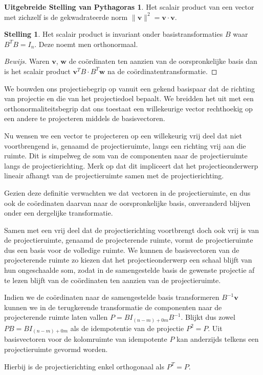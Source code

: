 \documentclass{amsart}
\theoremstyle{definition}
\newtheorem{thm}{Stelling}[section]
\newenvironment{bewijs}{\begin{proof}[Bewijs]}{\end{proof}}
\newcommand{\norm}[1]{\lVert{#1}\rVert}
\newcommand{\vvec}[1][v]{\mathbf{#1}}
\newcommand{\vnorm}[1]{\norm{\vvec[#1]}}
\begin{document}
\newtheorem*{pyth}{Uitgebreide Stelling van Pythagoras}
\begin{pyth}
	Het scalair product van een vector met zichzelf is de gekwadrateerde norm $\vnorm v^2 = \vvec\cdot\vvec$.
\end{pyth}

\begin{thm}
	Het scalair product is invariant onder basistransformaties $B$ waar $B^TB=I_n$. Deze noemt men orthonormaal.
	\begin{bewijs}
		Waren $\vvec$, $\vvec[w]$ de coördinaten ten aanzien van de oorspronkelijke basis dan is het scalair product $\vvec^T B\cdot B^T\vvec[w]$ na de coördinatentransformatie.
	\end{bewijs}
\end{thm}

We bouwden ons projectiebegrip op vanuit een gekend basispaar dat de richting van projectie en die van het projectiedoel bepaalt.
We breidden het uit met een orthonormaliteitsbegrip dat ons toestaat een willekeurige vector rechthoekig op een andere te projecteren middels de basisvectoren.

Nu wensen we een vector te projecteren op een willekeurig vrij deel dat niet voortbrengend is, genaamd de projectieruimte, langs een richting vrij aan die ruimte.
Dit is simpelweg de som van de componenten naar de projectieruimte langs de projectierichting.
Merk op dat dit impliceert dat het projectieonderwerp lineair afhangt van de projectieruimte samen met de projectierichting.

Gezien deze definitie verwachten we dat vectoren in de projectieruimte, en dus ook de coördinaten daarvan naar de oorspronkelijke basis, onveranderd blijven onder een dergelijke transformatie.

Samen met een vrij deel dat de projectierichting voortbrengt doch ook vrij is van de projectieruimte, genaamd de projecterende ruimte, vormt de projectieruimte dus een basis voor de volledige ruimte.
We kunnen de basisvectoren van de projecterende ruimte zo kiezen dat het projectieonderwerp een schaal blijft van hun ongeschaalde som, zodat in de samengestelde basis de gewenste projectie af te lezen blijft van de coördinaten ten aanzien van de projectieruimte.

Indien we de coördinaten naar de samengestelde basis transformeren $B^{-1}\vvec$ kunnen we in de terugkerende transformatie de componenten naar de projecterende ruimte laten vallen $P = BI_{(n-m)+0m}B^{-1}$.
Blijkt dus zowel $PB = BI_{(n-m)+0m}$ als de idempotentie van de projectie $P^2=P$.
Uit basisvectoren voor de kolomruimte van idempotente $P$ kan anderzijds telkens een projectieruimte gevormd worden.

Hierbij is de projectierichting enkel orthogonaal als $P^T=P$.

\newpage
\end{document}
